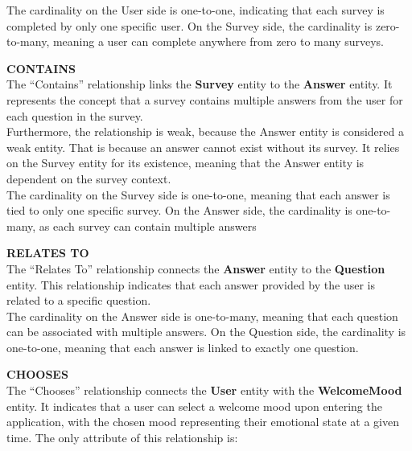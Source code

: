 \noindent The cardinality on the User side is one-to-one, indicating that each survey is completed by only one specific user. On the Survey side, the cardinality is zero-to-many, meaning a user can complete anywhere from zero to many surveys.

\vspace{5mm}

\noindent \textbf{CONTAINS} \\
The ``Contains'' relationship links the \textbf{Survey} entity to the \textbf{Answer} entity. It represents the concept that a survey contains multiple answers from the user for each question in the survey.\vspace{5mm} \\
Furthermore, the relationship is weak, because the Answer entity is considered a weak entity. That is because an answer cannot exist without its survey. It relies on the Survey entity for its existence, meaning that the Answer entity is dependent on the survey context.\vspace{5mm} \\
The cardinality on the Survey side is one-to-one, meaning that each answer is tied to only one specific survey. On the Answer side, the cardinality is one-to-many, as each survey can contain multiple answers

\vspace{5mm}

\noindent \textbf{RELATES TO} \\
The ``Relates To'' relationship connects the \textbf{Answer} entity to the \textbf{Question} entity. This relationship indicates that each answer provided by the user is related to a specific question.\vspace{5mm} \\
The cardinality on the Answer side is one-to-many, meaning that each question can be associated with multiple answers. On the Question side, the cardinality is one-to-one, meaning that each answer is linked to exactly one question.

\vspace{5mm}

\noindent \textbf{CHOOSES} \\
The ``Chooses'' relationship connects the \textbf{User} entity with the \textbf{WelcomeMood} entity. It indicates that a user can select a welcome mood upon entering the application, with the chosen mood representing their emotional state at a given time. The only attribute of this relationship is:

